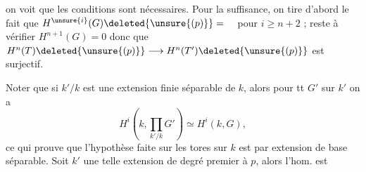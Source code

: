 on voit que les conditions sont nécessaires.
Pour la suffisance, on tire d'abord le fait
que $H^{\unsure{i}}(G)\deleted{\unsure{(p)}}=\quad$ pour $i\geq n+2$ ; reste
à vérifier $H^{n+1}(G)=0$ donc que
$H^n(T)\deleted{\unsure{(p)}}\longrightarrow H^n(T')\deleted{\unsure{(p)}}$ est surjectif.

Noter que si $k'/k$ est une extension finie
séparable de $k$, alors pour tt $G'$ sur $k'$
on a
\[
H^i(k,\prod_{k'/k}G')\simeq H^i(k,G),
\]
ce qui prouve que l'hypothèse faite sur
les tores sur $k$ est \uline{} par
extension de base séparable. Soit $k'$ une
telle extension de degré premier à $p$, alors
l'hom. 
est  

